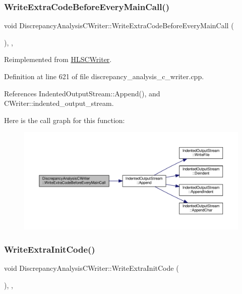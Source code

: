 \subsubsection{\texorpdfstring{Write\+Extra\+Code\+Before\+Every\+Main\+Call()}{WriteExtraCodeBeforeEveryMainCall()}}
{\footnotesize\ttfamily void Discrepancy\+Analysis\+C\+Writer\+::\+Write\+Extra\+Code\+Before\+Every\+Main\+Call (\begin{DoxyParamCaption}{ }\end{DoxyParamCaption})\hspace{0.3cm}{\ttfamily [override]}, {\ttfamily [protected]}, {\ttfamily [virtual]}}



Reimplemented from \hyperlink{classHLSCWriter_a3b1718b9bd4cf44bf5c9e73af2b25986}{H\+L\+S\+C\+Writer}.



Definition at line 621 of file discrepancy\+\_\+analysis\+\_\+c\+\_\+writer.\+cpp.



References Indented\+Output\+Stream\+::\+Append(), and C\+Writer\+::indented\+\_\+output\+\_\+stream.

Here is the call graph for this function\+:
\nopagebreak
\begin{figure}[H]
\begin{center}
\leavevmode
\includegraphics[width=350pt]{d4/d5c/classDiscrepancyAnalysisCWriter_a174c35dd3c04952215d5a5f9aa0df0c9_cgraph}
\end{center}
\end{figure}
\mbox{\label{classDiscrepancyAnalysisCWriter_a4372f752e67aea0e47542ee355932da2}} 
\subsubsection{\texorpdfstring{Write\+Extra\+Init\+Code()}{WriteExtraInitCode()}}
{\footnotesize\ttfamily void Discrepancy\+Analysis\+C\+Writer\+::\+Write\+Extra\+Init\+Code (\begin{DoxyParamCaption}{ }\end{DoxyParamCaption})\hspace{0.3cm}{\ttfamily [override]}, {\ttfamily [protected]}, {\ttfamily [virtual]}}



